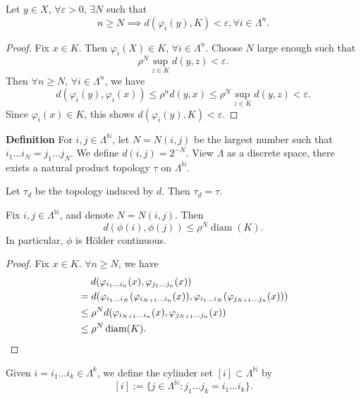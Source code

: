 \begin{proposition}\label{prop:2.3}
Let $y \in X$, $\forall \varepsilon>0$, $\exists N$ such that
\[
n \geq N\implies d(\varphi _{i}(y),K)<\varepsilon, \forall i \in \Lambda ^{n}.
\]
\end{proposition}

\begin{proof}
Fix $x \in K$. Then $\varphi _{i}(X)\in K$, $\forall i \in \Lambda ^{n}$. Choose $N$ large enough such that
\[
\rho ^{N}\sup_{z \in K}d(y,z)<\varepsilon.
\]
Then $\forall n\geq N$, $\forall i \in \Lambda ^{n}$, we have
\[
d(\varphi _{i}(y),\varphi _{i}(x))\leq \rho ^{n}d(y,x)\leq \rho ^{N}\sup_{z \in K}d(y,z) <\varepsilon.
\]
Since $\varphi _{i}(x) \in K$, this shows $d(\varphi _{i}(y),K)<\varepsilon$.
\end{proof}

\textbf{Definition} For $i,j \in \Lambda ^{\mathbb{N}}$, let $N=N(i,j)$ be the largest number such that $i_{1}\dots i_{N}=j_{1}\dots j_{N}$. We define $d(i,j)=2^{-N}$.
View $\Lambda$ as a discrete space, there exists a natural product topology $\tau$ on $\Lambda ^{\mathbb{N}}$.

\begin{proposition}\label{prop:2.4}
Let $\tau _{d}$ be the topology induced by $d$. Then $\tau _{d}=\tau$.
\end{proposition}

\begin{proposition}\label{prop:2.5}
Fix $i,j \in \Lambda ^{\mathbb{N}}$, and denote $N=N(i,j)$. Then
\[
d(\phi(i),\phi (j))\leq \rho ^{N}\operatorname{diam}(K).
\]
In particular, $\phi$ is Hölder continuous.
\end{proposition}

\begin{proof}
Fix $x \in K$. $\forall n\geq N$, we have
\begin{align*}
& \hspace{1.3em} d(\varphi_{i_{1}\dots i_{n}}(x),\varphi_{j_{1}\dots j_{n}}(x)) \\
& = d(\varphi_{i_{1}\dots i_{N}}(\varphi_{i_{N+1}\dots i_{n}}(x)),\varphi _{i_{1}\dots i_{N}}(\varphi_{j_{N+1}\dots j_{n}}(x))) \\
& \leq \rho^{N}d(\varphi_{i_{N+1}\dots i_{n}}(x),\varphi_{j_{N+1}\dots j_{n}}(x)) \\
& \leq \rho^{N}\operatorname{diam}(K).
\end{align*}
\end{proof}

Given $i=i_{1}\dots i_{k}\in \Lambda ^{k}$, we define the cylinder set $[i]\subset \Lambda ^{\mathbb{N}}$ by
\[
[i]:=\{ j \in \Lambda ^{\mathbb{N}}:j_{1}\dots j_{k}=i_{1}\dots i_{k} \}.
\]

